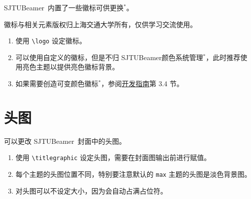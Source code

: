 \documentclass[
    UTF8,
    heading=true,
    12pt,
    a4paper
]{ctexrep}
\def\themename{\textsf{SJTUBeamer}}
\begin{document}
    \themename\ 内置了一些徽标可供更换$^*$。

    \faInfoCircle 徽标与相关元素版权归上海交通大学所有，仅供学习交流使用。

    \begin{tcbitemize}[raster rows=2, raster columns=3, raster every box/.style={center title, valign=center, halign=center,fonttitle=\ttfamily,colback=white}]
    \tcbitem[raster multicolumn=2,blankest]
        \begin{tcbitemize}[raster columns=2]
            \tcbitem[title={\textbackslash{}cnlogo}] \moveleft 0.3cm\hbox{\resizebox{!}{1cm}{\cnlogo}}
            \tcbitem[title={\textbackslash{}enlogo}] \moveleft 0.3cm\hbox{\resizebox{!}{1cm}{\enlogo}}
            \tcbitem[title={\textbackslash{}sjtubadge},height=3.5cm] \resizebox{!}{2cm}{\sjtubadge\ } 
            \tcbitem[title={\textbackslash{}dlogo},height=3.5cm] \resizebox{3cm}{!}{\dlogo\ }
        \end{tcbitemize}
    \tcbitem[title={\textbackslash{}vlogo}] \resizebox{!}{4.8cm}{\vlogo\ }
    \end{tcbitemize}


    \begin{enumerate}\small
        \item 使用 \texttt{\textbackslash{}logo} 设定徽标。
        \item 可以使用自定义的徽标，但是不归 \themename 颜色系统管理$^*$，此时推荐使用亮色主题以提供亮色徽标背景。
        \item 如果需要创造可变颜色徽标$^*$，参阅\href{run:sjtubeamerdevguide.pdf}{开发指南}第 3.4 节。
    \end{enumerate}

    \chapter{头图}

    可以更改 \themename\ 封面中的头图。


    \begin{enumerate}
        \item 使用 \texttt{\textbackslash{}titlegraphic} 设定头图，需要在封面图输出前进行赋值。
        \item 每个主题的头图位置不同，特别要注意默认的 \texttt{max} 主题的头图是淡色背景图。
        \item 对头图可以不设定大小，因为会自动占满占位符。
    \end{enumerate}
\end{document}
